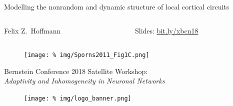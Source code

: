 \begin{frame}
  \vspace{0.6cm}
  
  \begin{center} 
    \huge Modelling the nonrandom and dynamic structure of local
    cortical circuits
  \end{center}
  
  \vspace{0.5cm}

  \large
  \begin{columns}[t]
    \hfill\Large
    \begin{column}{0.4\textwidth}
      \minipage[c][0.2\textheight][s]{\columnwidth}
      \hspace{0.6cm} Felix Z.~Hoffmann \textcolor{white}{y}
      \endminipage                 
    \end{column}
    \begin{column}{0.4\textwidth}
      \minipage[c][0.2\textheight][s]{\columnwidth}
      \hspace{0.6cm} Slides: \href{http://bit.ly/xbcn18}{bit.ly/xbcn18}
      \endminipage           
    \end{column}
    \hfill
  \end{columns}

  \vspace{-1cm}

  \begin{figure}
    \centering
    \texttt{[image: \%
      img/Sporns2011\_Fig1C.png]} %
    \nocite{Sporns2011}
  \end{figure}


  \begin{center}
    \Large Bernstein Conference 2018 Satellite Workshop:\\
    \textit{Adaptivity and Inhomogeneity in Neuronal Networks}
  \end{center}

  \vspace{0.2cm}
  
  \begin{figure}
    \centering
    \texttt{[image: \%
      img/logo\_banner.png]} %
  \end{figure}



\end{frame}

